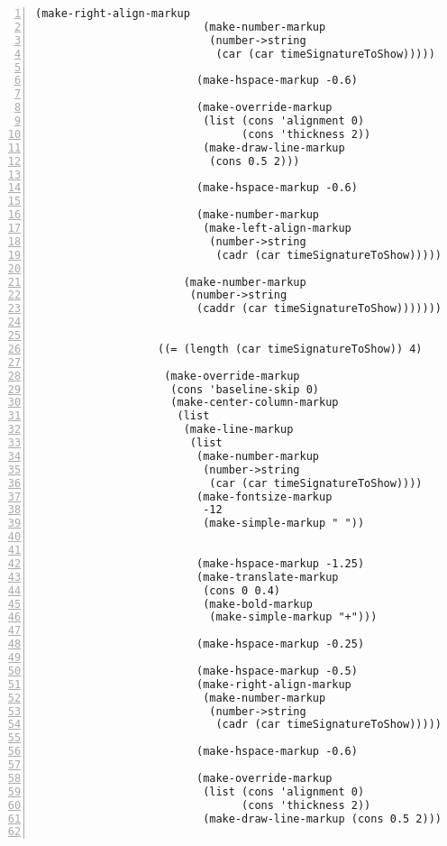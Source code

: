 \begin{Verbatim}[numbers=left,xleftmargin=5mm]
                         (make-right-align-markup
                          (make-number-markup
                           (number->string
                            (car (car timeSignatureToShow)))))

                         (make-hspace-markup -0.6)

                         (make-override-markup
                          (list (cons 'alignment 0)
                                (cons 'thickness 2))
                          (make-draw-line-markup
                           (cons 0.5 2)))

                         (make-hspace-markup -0.6)

                         (make-number-markup
                          (make-left-align-markup
                           (number->string
                            (cadr (car timeSignatureToShow)))))))

                       (make-number-markup
                        (number->string
                         (caddr (car timeSignatureToShow))))))))


                   ((= (length (car timeSignatureToShow)) 4)

                    (make-override-markup
                     (cons 'baseline-skip 0)
                     (make-center-column-markup
                      (list
                       (make-line-markup
                        (list
                         (make-number-markup
                          (number->string
                           (car (car timeSignatureToShow))))
                         (make-fontsize-markup
                          -12
                          (make-simple-markup " "))


                         (make-hspace-markup -1.25)
                         (make-translate-markup
                          (cons 0 0.4)
                          (make-bold-markup
                           (make-simple-markup "+")))

                         (make-hspace-markup -0.25)

                         (make-hspace-markup -0.5)
                         (make-right-align-markup
                          (make-number-markup
                           (number->string
                            (cadr (car timeSignatureToShow)))))

                         (make-hspace-markup -0.6)

                         (make-override-markup
                          (list (cons 'alignment 0)
                                (cons 'thickness 2))
                          (make-draw-line-markup (cons 0.5 2)))


\end{Verbatim}
